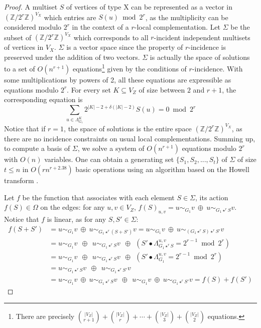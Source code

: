 \documentclass[a4paper,UKenglish,cleveref,autoref,thm-restate]{arxiv}
\newcommand{\ls}{\leqslant}
\newcommand{\Zp}[1]{\mathbb{Z}/#1\mathbb{Z}}
\begin{document}
\begin{proof}
    A multiset $S$ of vertices of type X can be represented as a vector in $({\Zp{2^r}})^{V_X}$ which entries are $S(u) \bmod 2^{r}$, as the multiplicity can be considered modulo $2^r$ in the context of a $r$-local complementation. Let $\Sigma$ be the subset of $({\Zp{2^r}})^{V_X}$ which corresponds to all $r$-incident independent multisets of vertices in $V_X$. $\Sigma$ is a vector space since the property of $r$-incidence is preserved under the addition of two vectors. $\Sigma$ is actually the space of solutions to a set of $O(n^{r+1})$ equations\footnote{There are precisely $\binom{|V_Z|}{r+1}+\binom{|V_Z|}{r}+\cdots+\binom{|V_Z|}{3}+\binom{|V_Z|}{2}$ equations.} given by the conditions of $r$-incidence. With some multiplications by powers of 2, all these equations are expressible as equations modulo $2^{r}$. For every set  $K\subseteq V_Z$ of size between $2$ and $r+1$, the corresponding equation is $$\sum_{u \in \Lambda_{G_1}^K}2^{|K|-2+\delta(|K|-2)}S(u) = 0\bmod 2^{r}$$
    Notice that if $r=1$, the space of solutions is the entire space $({\Zp{2^r}})^{V_X}$, as there are no incidence constraints on usual local complementations. Summing up, to compute a basis of $\Sigma$, we solve a system of $O(n^{r+1})$ equations modulo $2^{r}$ with $O(n)$ variables. One can obtain a generating set $\{S_1,S_2,...,S_t\}$ of $\Sigma$ of size $t \ls n$ in $O(r n^{r+2.38})$ basic operations using an algorithm based on the Howell transform \cite{storjohann2000algorithms}. 

    Let $f$ be the function that associates with each element $S \in \Sigma$, its action $f(S) \in \Omega$ on the edges: for any $u,v \in V_Z$, $f(S)_{u,v} = u\sim_{G_1} v ~\oplus~ u\sim_{G_1\star^r S} v$. Notice that $f$ is linear, as for any $S, S' \in \Sigma$:
    \begin{align*}
        f(S+S') &= u\sim_{G_1} v ~\oplus~ u\sim_{G_1\star^r (S+S')} v
        = u\sim_{G_1} v ~\oplus~ u\sim_{(G_1\star^r S) \star^r S'} v\\
        &= u\sim_{G_1} v ~~\oplus~~ u\sim_{G_1\star^r S} v ~~\oplus~~ \left(S' \bullet\Lambda_{G_1\star^r S}^{u,v} = 2^{r-1}\bmod 2^{r}\right)\\
        &= u\sim_{G_1} v ~~\oplus~~ u\sim_{G_1\star^r S} v ~~\oplus~~ \left(S' \bullet\Lambda_{G_1}^{u,v} = 2^{r-1}\bmod 2^{r}\right)\\
        &= u\sim_{G_1 \star^r S} v ~~\oplus~~ u\sim_{G_1\star^r S'} v\\
        &= u\sim_{G_1} v ~\oplus~ u\sim_{G_1 \star^r S} v ~~\oplus~~ u\sim_{G_1} v ~\oplus~ u\sim_{G_1\star^r S'} v = f(S)+f(S')
    \end{align*} 


\end{proof}
\end{document}
